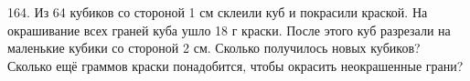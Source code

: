 164. Из 64 кубиков со стороной 1 см склеили куб и покрасили краской. На окрашивание всех граней куба ушло 18 г краски. После этого куб разрезали на маленькие кубики со стороной 2 см. Сколько получилось новых кубиков? Сколько ещё граммов краски понадобится, чтобы окрасить неокрашенные грани?\\
